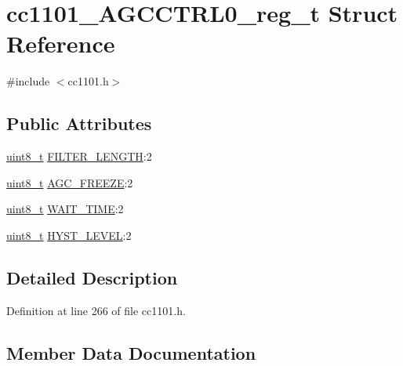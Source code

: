 \hypertarget{structcc1101___a_g_c_c_t_r_l0__reg__t}{}\section{cc1101\+\_\+\+A\+G\+C\+C\+T\+R\+L0\+\_\+reg\+\_\+t Struct Reference}
\label{structcc1101___a_g_c_c_t_r_l0__reg__t}


{\ttfamily \#include $<$cc1101.\+h$>$}

\subsection*{Public Attributes}
\begin{DoxyCompactItemize}
\item 
\hyperlink{_p_e___types_8h_aba7bc1797add20fe3efdf37ced1182c5}{uint8\+\_\+t} \hyperlink{structcc1101___a_g_c_c_t_r_l0__reg__t_a62ff3eb497a99178ece5143ca102e6f5}{F\+I\+L\+T\+E\+R\+\_\+\+L\+E\+N\+G\+TH}\+:2
\item 
\hyperlink{_p_e___types_8h_aba7bc1797add20fe3efdf37ced1182c5}{uint8\+\_\+t} \hyperlink{structcc1101___a_g_c_c_t_r_l0__reg__t_a0f3d99b89d3cf2b77a6e2d64759ad100}{A\+G\+C\+\_\+\+F\+R\+E\+E\+ZE}\+:2
\item 
\hyperlink{_p_e___types_8h_aba7bc1797add20fe3efdf37ced1182c5}{uint8\+\_\+t} \hyperlink{structcc1101___a_g_c_c_t_r_l0__reg__t_a3b515e35e19a9a171be5c3f4038beccb}{W\+A\+I\+T\+\_\+\+T\+I\+ME}\+:2
\item 
\hyperlink{_p_e___types_8h_aba7bc1797add20fe3efdf37ced1182c5}{uint8\+\_\+t} \hyperlink{structcc1101___a_g_c_c_t_r_l0__reg__t_a61f35d185961739d968ec87d00583a93}{H\+Y\+S\+T\+\_\+\+L\+E\+V\+EL}\+:2
\end{DoxyCompactItemize}


\subsection{Detailed Description}


Definition at line 266 of file cc1101.\+h.



\subsection{Member Data Documentation}
